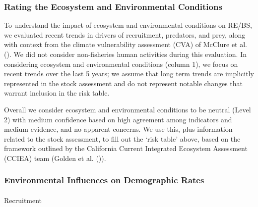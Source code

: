 \documentclass[
]{scrartcl}
\makeatletter
\let\oldparagraph\paragraph
\renewcommand{\paragraph}{
    \@ifstar
      \xxxParagraphStar
      \xxxParagraphNoStar
  }
\newcommand{\xxxParagraphStar}[1]{\oldparagraph*{#1}\mbox{}}
\newcommand{\xxxParagraphNoStar}[1]{\oldparagraph{#1}\mbox{}}
\makeatother
\begin{document}
\subsubsection{Rating the Ecosystem and Environmental
Conditions}\label{rating-the-ecosystem-and-environmental-conditions}

To understand the impact of ecosystem and environmental conditions on
RE/BS, we evaluated recent trends in drivers of recruitment, predators,
and prey, along with context from the climate vulnerability assessment
(CVA) of McClure et al. (). We did not
consider non-fisheries human activities during this evaluation. In
considering ecosystem and environmental conditions (column 1), we focus
on recent trends over the last 5 years; we assume that long term trends
are implicitly represented in the stock assessment and do not represent
notable changes that warrant inclusion in the risk table.

Overall we consider ecosystem and environmental conditions to be neutral
(Level 2) with medium confidence based on high agreement among
indicators and medium evidence, and no apparent concerns. We use this,
plus information related to the stock assessment, to fill out the `risk
table' above, based on the framework outlined by the California Current
Integrated Ecosystem Assessment (CCIEA) team (Golden et al.
()).

\subsubsection{Environmental Influences on Demographic
Rates}\label{environmental-influences-on-demographic-rates}

\paragraph{Recruitment}\label{recruitment-1}
\end{document}
